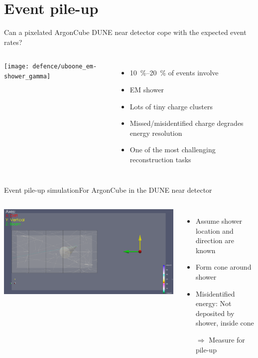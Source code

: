 \documentclass[]{beamer}
\newcommand*{\AC}{{ArgonCube}}
\newcommand*{\dune}{{DUNE}}
\begin{document}
\section{Event pile-up}

\begin{frame}{Can a pixelated \AC{} \dune{} near detector cope with the expected event rates?}
	\begin{columns}[c]
		\centering
		\texttt{[image: defence/uboone\_em-shower\_gamma]}
		\begin{itemize}
			\item \SIrange{10}{20}{\percent} of events involve \Pgpz
			\item \HepProcess{\Pgpz \to \Pgg\Pgg} \textrightarrow{} EM shower
			\item Lots of tiny charge clusters
			\item Missed/misidentified charge degrades energy resolution
			\item One of the most challenging reconstruction tasks
		\end{itemize}
	\end{columns}
\end{frame}

\begin{frame}{Event pile-up simulation}{For \AC{} in the \dune{} near detector}
	\begin{columns}[c]
		\centering
		\includegraphics[viewport=2900 1800 4000 2600, clip, width=\textwidth]{pile-up/uid0_spill6_event461_gamma19_x}
		\begin{itemize}
			\item Assume shower location and direction are known
			\item Form cone around shower
			\item Misidentified energy: Not deposited by shower, inside cone
			\item[$\Rightarrow$] Measure for pile-up
		\end{itemize}
	\end{columns}
\end{frame}
\end{document}
